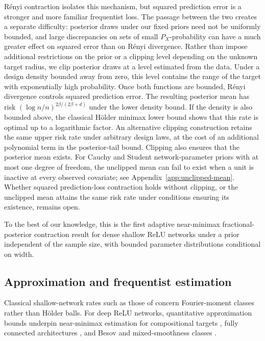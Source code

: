 \documentclass[11pt,a4paper]{article}
\theoremstyle{remark}
\begin{document}
R\'enyi contraction isolates this mechanism, but squared
prediction error is a stronger and more familiar
frequentist loss. The passage between the two creates a separate
difficulty: posterior draws under our fixed priors need not be
uniformly bounded, and large discrepancies on sets of small
$P_X$-probability can have a much greater effect on squared error than
on R\'enyi divergence. Rather than impose additional restrictions on
the prior or a clipping level depending on the unknown target radius,
we clip posterior draws at a level estimated from the data. Under a
design density bounded away from zero, this level contains the range
of the target with exponentially high probability. Once both functions
are bounded, R\'enyi divergence controls squared prediction error.
The resulting posterior mean has risk
$(\log n/n)^{2\beta/(2\beta+d)}$ under the lower density bound.
If the density is also bounded above, the classical H\"older minimax
lower bound shows that this rate is optimal up to a logarithmic factor.
An alternative clipping construction retains the same upper
risk rate under arbitrary design laws, at the cost of an additional
polynomial term in the posterior-tail bound. Clipping also ensures
that the posterior mean exists. For Cauchy and Student network-parameter priors with
at most one degree of freedom, the unclipped mean can fail to exist
when a unit is inactive at every observed covariate; see
Appendix~\ref{app:unclipped-mean}. Whether squared prediction-loss
contraction holds without clipping, or the unclipped mean attains
the same risk rate under conditions ensuring its existence, remains open.

To the best of our knowledge, this is the first adaptive near-minimax
fractional-posterior contraction result for dense shallow ReLU networks
under a prior independent of the sample size, with bounded parameter
distributions conditional on width.

\subsection{Approximation and frequentist estimation}\label{sec:related}

Classical shallow-network rates such as those of \citet{barron1993}
concern Fourier-moment classes rather than H\"older balls.
For deep ReLU networks, quantitative approximation bounds
\citep{yarotsky2017} underpin near-minimax estimation for
compositional targets \citep{schmidthieber2020}, fully connected
architectures \citep{kohlerlanger2021}, and Besov and mixed-smoothness
classes \citep{suzuki2019}.
\end{document}
